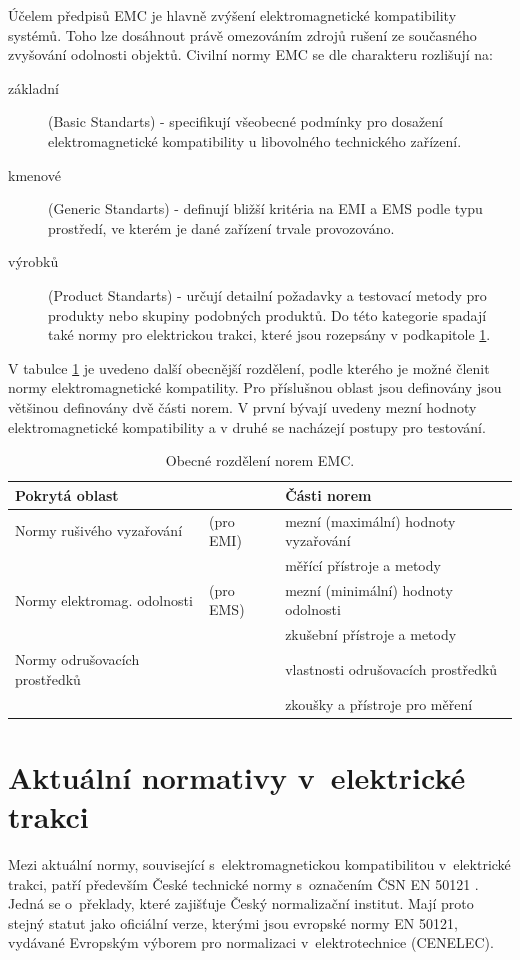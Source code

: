 Účelem předpisů EMC je hlavně zvýšení elektromagnetické kompatibility systémů. Toho lze dosáhnout právě omezováním zdrojů rušení ze současného zvyšování odolnosti objektů. Civilní normy EMC se dle charakteru rozlišují na:
\begin{description}
\item[základní] (Basic Standarts) - specifikují všeobecné podmínky pro dosažení elektromagnetické kompatibility u libovolného technického zařízení.
\item[kmenové] (Generic Standarts) - definují bližší kritéria na EMI a EMS podle typu prostředí, ve kterém je dané zařízení trvale provozováno.
\item[výrobků] (Product Standarts) - určují detailní požadavky a testovací metody pro produkty nebo skupiny podobných produktů. Do této kategorie spadají také normy pro elektrickou trakci, které jsou rozepsány v podkapitole \ref{sec:emc_normy_trakce}.
\end{description}

V tabulce \ref{tab:emc_deleni} je uvedeno další obecnější rozdělení, podle kterého je možné členit normy elektromagnetické kompatility. Pro příslušnou oblast jsou definovány jsou většinou definovány dvě části norem. V první bývají uvedeny mezní hodnoty elektromagnetické kompatibility a v druhé se nacházejí postupy pro testování.

\begin{table}[!h]
\begin{center}
  	\caption{Obecné rozdělení norem EMC.}
  	\label{tab:emc_deleni}
\begin{tabular}{|ll|l|}
	\hline
	{\bf Pokrytá oblast} & & {\bf Části norem} \\
	\hline
	\hline
	Normy rušivého vyzařování & (pro EMI) & mezní (maximální) hodnoty vyzařování \\
	& & měřící přístroje a metody \\
	\hline
	Normy elektromag. odolnosti & (pro EMS) & mezní (minimální) hodnoty odolnosti \\
	& & zkušební přístroje a metody \\
	\hline
	Normy odrušovacích prostředků & & vlastnosti odrušovacích prostředků \\
	& & zkoušky a přístroje pro měření \\
	\hline
\end{tabular}
\end{center}
\end{table}
\newpage

\section{Aktuální normativy v~elektrické trakci} \label{sec:emc_normy_trakce}
Mezi aktuální normy, související s~elektromagnetickou kompatibilitou v~elektrické trakci, patří především České technické normy s~označením ČSN EN 50121 \cite{csn}. Jedná se o~překlady, které zajišťuje Český normalizační institut. Mají proto stejný statut jako oficiální verze, kterými jsou evropské normy EN 50121, vydávané Evropským výborem pro normalizaci v~elektrotechnice (CENELEC). 

